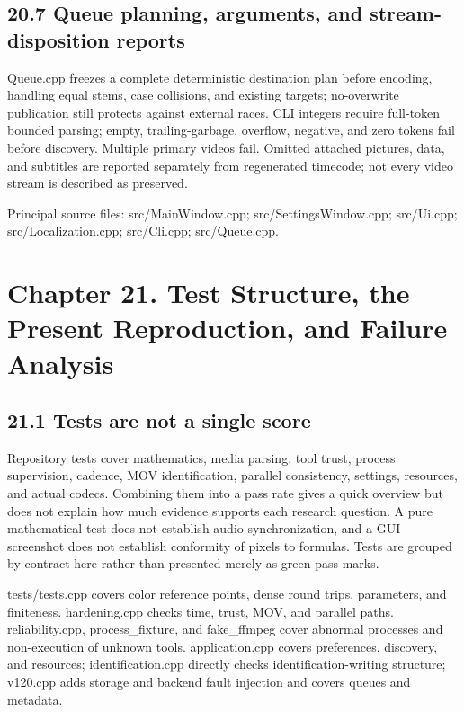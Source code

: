 \documentclass[11pt,a4paper,openany]{book}
\begin{document}
\section*{20.7 Queue planning, arguments, and stream-disposition reports}
Queue.cpp freezes a complete deterministic destination plan before encoding, handling equal stems, case collisions, and existing targets; no-overwrite publication still protects against external races. CLI integers require full-token bounded parsing; empty, trailing-garbage, overflow, negative, and zero tokens fail before discovery. Multiple primary videos fail. Omitted attached pictures, data, and subtitles are reported separately from regenerated timecode; not every video stream is described as preserved.


\par\small Principal source files: src/MainWindow.cpp; src/SettingsWindow.cpp; src/Ui.cpp; src/Localization.cpp; src/Cli.cpp; src/Queue.cpp.\normalsize

\chapter*{Chapter 21. Test Structure, the Present Reproduction, and Failure Analysis}

\section*{21.1 Tests are not a single score}
Repository tests cover mathematics, media parsing, tool trust, process supervision, cadence, MOV identification, parallel consistency, settings, resources, and actual codecs. Combining them into a pass rate gives a quick overview but does not explain how much evidence supports each research question. A pure mathematical test does not establish audio synchronization, and a GUI screenshot does not establish conformity of pixels to formulas. Tests are grouped by contract here rather than presented merely as green pass marks.

tests/tests.cpp covers color reference points, dense round trips, parameters, and finiteness. hardening.cpp checks time, trust, MOV, and parallel paths. reliability.cpp, process\_fixture, and fake\_ffmpeg cover abnormal processes and non-execution of unknown tools. application.cpp covers preferences, discovery, and resources; identification.cpp directly checks identification-writing structure; v120.cpp adds storage and backend fault injection and covers queues and metadata.
\end{document}
